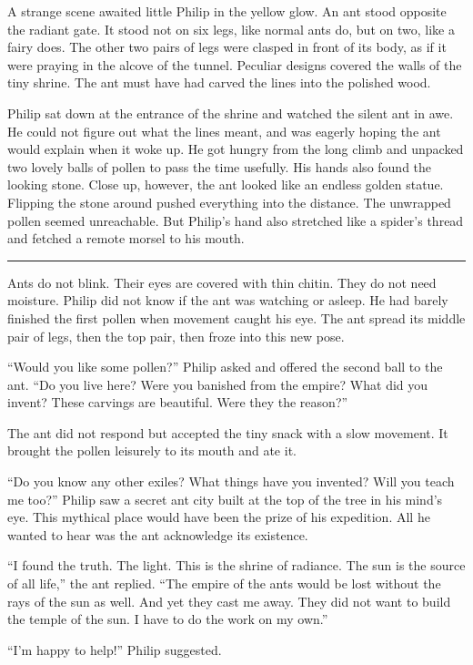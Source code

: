 \documentclass[10pt, draft]{memoir}
\renewcommand{\pfbreakdisplay}{\bigskip \ding{166} \bigskip}
\newcommand{\secbreak}{\fancybreak{\pfbreakdisplay}}
\begin{document}
A strange scene awaited little Philip in the yellow glow. An ant stood opposite
the radiant gate. It stood not on six legs, like normal ants do, but on two,
like a fairy does. The other two pairs of legs were clasped in front of its
body, as if it were praying in the alcove of the tunnel. Peculiar designs
covered the walls of the tiny shrine. The ant must have had carved the lines
into the polished wood.

Philip sat down at the entrance of the shrine and watched the silent ant in
awe. He could not figure out what the lines meant, and was eagerly hoping the
ant would explain when it woke up. He got hungry from the long climb and
unpacked two lovely balls of pollen to pass the time usefully. His hands also
found the looking stone. Close up, however, the ant looked like an endless
golden statue. Flipping the stone around pushed everything into the distance.
The unwrapped pollen seemed unreachable. But Philip's hand also stretched like
a spider's thread and fetched a remote morsel to his mouth.

\secbreak

Ants do not blink. Their eyes are covered with thin chitin. They do not need
moisture. Philip did not know if the ant was watching or asleep. He had barely
finished the first pollen when movement caught his eye. The ant spread its
middle pair of legs, then the top pair, then froze into this new pose.

``Would you like some pollen?'' Philip asked and offered the second ball to the
ant. ``Do you live here? Were you banished from the empire? What did you
invent? These carvings are beautiful. Were they the reason?''

The ant did not respond but accepted the tiny snack with a slow movement. It
brought the pollen leisurely to its mouth and ate it.

``Do you know any other exiles? What things have you invented? Will you teach
me too?'' Philip saw a secret ant city built at the top of the tree in his
mind's eye. This mythical place would have been the prize of his expedition.
All he wanted to hear was the ant acknowledge its existence.

``I found the truth. The light. This is the shrine of radiance. The sun is the
source of all life,'' the ant replied. ``The empire of the ants would be lost
without the rays of the sun as well. And yet they cast me away. They did not
want to build the temple of the sun. I have to do the work on my own.''

``I'm happy to help!'' Philip suggested.
\end{document}
